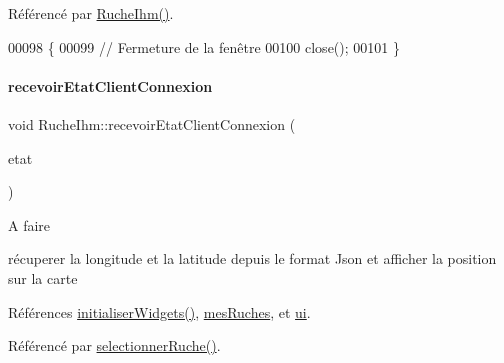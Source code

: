 Référencé par \hyperlink{class_ruche_ihm_a04c2544ba4e9cca6c38f553c32d63dee}{Ruche\+Ihm()}.


\begin{DoxyCode}
00098 \{
00099     \textcolor{comment}{// Fermeture de la fenêtre}
00100     close();
00101 \}
\end{DoxyCode}
\mbox{\label{class_ruche_ihm_a3a3dae9de8c51344aa6e3463db9e6ad9}} 
\paragraph{\texorpdfstring{recevoir\+Etat\+Client\+Connexion}{recevoirEtatClientConnexion}}
{\footnotesize\ttfamily void Ruche\+Ihm\+::recevoir\+Etat\+Client\+Connexion (\begin{DoxyParamCaption}\item[{bool}]{etat }\end{DoxyParamCaption})\hspace{0.3cm}{\ttfamily [slot]}}

\begin{DoxyRefDesc}{A faire}
\item[\hyperlink{todo__todo000006}{A faire}]récuperer la longitude et la latitude depuis le format Json et afficher la position sur la carte \end{DoxyRefDesc}


Références \hyperlink{class_ruche_ihm_a98c493fcd2ef145a3d51ff84bbf8748e}{initialiser\+Widgets()}, \hyperlink{class_ruche_ihm_ab7741fa67b19cbb2da7eb12c58cf83c1}{mes\+Ruches}, et \hyperlink{class_ruche_ihm_a64786058bd7f88ca2f1e9743bb27c25b}{ui}.



Référencé par \hyperlink{class_ruche_ihm_a7324ae6ea574ccdad47783f466933157}{selectionner\+Ruche()}.


